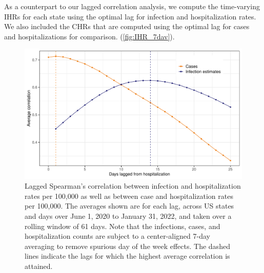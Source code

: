 \documentclass{article}
\begin{document}
As a counterpart to our lagged correlation analysis, we compute the time-varying IHRs 
for each state using the optimal lag for infection and hospitalization rates. We also included
the CHRs that are computed using the optimal lag for cases and hospitalizations for comparison.
(\autoref{fig:IHR_7dav}). 

\begin{figure}[!tb]
\centering
    \includegraphics[width=.8\textwidth]{infect_case_hosp_lag_corr_Nov2.pdf} 
    \caption{Lagged Spearman's correlation between infection and hospitalization
    rates per 100,000 as well as between case and hospitalization rates per
    100,000. The averages shown are for each lag, across US states and days
    over June 1, 2020 to January 31, 2022, and taken over a rolling window of
    61 days. Note that the infections, cases, and hospitalization counts are
    subject to a center-aligned 7-day averaging to remove spurious day of the
    week effects. The dashed lines indicate the lags for which the highest
    average correlation is attained.}
    \label{fig:infect_case_hosp_lag_corr}
\end{figure}
\end{document}

